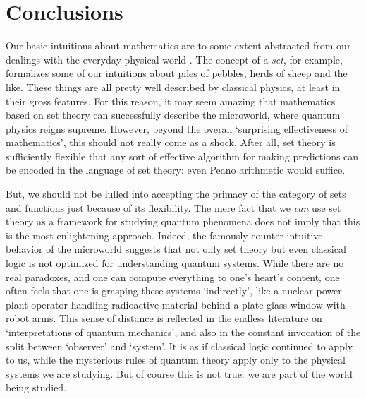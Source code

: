 \documentclass{article}
\begin{document}
\section{Conclusions} 
\label{conclusions}

Our basic intuitions about mathematics are to some extent
abstracted from our dealings with the everyday physical 
world \cite{Lakoff}.  The concept of a {\it set}, 
for example, formalizes some of our intuitions about piles of pebbles,
herds of sheep and the like.   These things are all pretty
well described by classical physics, at least in their gross
features.  For this reason, it may seem amazing that mathematics based
on set theory can successfully describe the microworld, where
quantum physics reigns supreme.  However, beyond the overall
`surprising effectiveness of mathematics', this should not really
come as a shock.  After all, set theory is sufficiently flexible
that any sort of effective algorithm for making predictions can be 
encoded in the language of set theory: even Peano arithmetic
would suffice.

But, we should not be lulled into accepting the primacy of the
category of sets and functions just because of its flexibility.
The mere fact that we {\it can} use set theory as a 
framework for studying quantum phenomena does not imply that this is 
the most enlightening approach.  Indeed, the famously counter-intuitive
behavior of the microworld suggests that not only
set theory but even classical logic is not optimized for understanding
quantum systems.   While there are no real paradoxes, and one
can compute everything to one's heart's content, one often feels
that one is grasping these systems `indirectly', like a nuclear 
power plant operator handling radioactive material behind a plate glass 
window with robot arms.  This sense of distance is reflected in
the endless literature on `interpretations of quantum mechanics',
and also in the constant invocation of the split between `observer'
and `system'.  It is as if classical logic continued to apply 
to us, while the mysterious rules of quantum theory apply only 
to the physical systems we are studying.  But of course this is not
true: we are part of the world being studied.  
\end{document}
